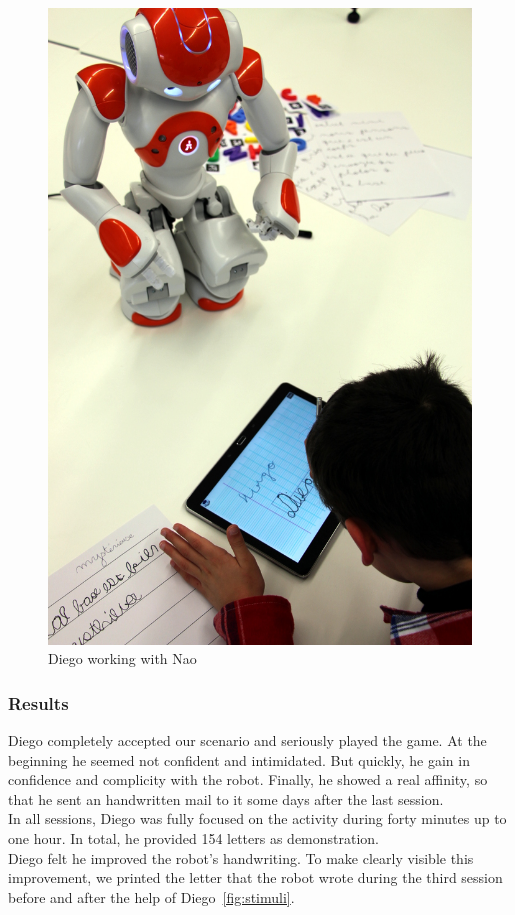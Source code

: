 \documentclass{article}
\begin{document}
\begin{figure}
    \centering
    \includegraphics[width=0.5\linewidth]{diego}
    \caption{\small Diego working with Nao}
    \label{fig:diego}
\end{figure}


\subsubsection{Results}
Diego completely accepted our scenario and seriously played the game. At the
beginning he seemed not confident and intimidated.  But quickly, he gain in
confidence and complicity with the robot. Finally, he showed a real affinity, so
that he sent an handwritten mail to it some days after the last
session.\\ 

In all sessions, Diego was fully focused on the activity during forty minutes up to one
hour. In total, he provided 154 letters as demonstration.\\

Diego felt he improved the robot's handwriting. To make clearly visible this
improvement, we printed the letter that the robot wrote during the third
session before and after the help of Diego~\ref{fig:stimuli}.
\end{document}
